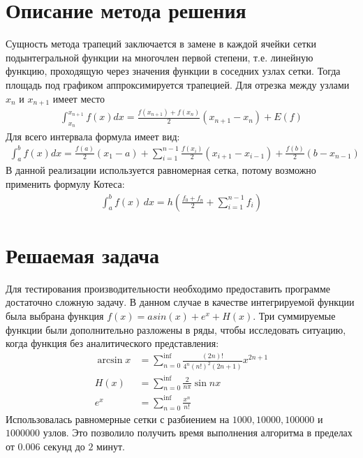 \documentclass[a4paper,12pt,titlepage,finall]{article}
\begin{document}
\section{Описание метода решения}
Сущность метода трапеций заключается в замене в каждой ячейки сетки подынтегральной функции на многочлен первой степени, т.е. линейную функцию, проходящую через значения функции в соседних узлах сетки. Тогда площадь под графиком аппроксимируется трапецией. Для отрезка между узлами $x_n$ и $x_{n+1}$ имеет место
\begin{align*}
\int^{x_{n+1}}_{x_n} f(x) dx = \frac{f(x_{n+1}) + f(x_{n})}{2}(x_{n+1} - x_n) + E(f)
\end{align*}
Для всего интервала формула имеет вид:
\begin{align*}
\int^b_a f(x) dx = \frac{f(a)}{2} (x_1 - a) + \sum_{i=1}^{n-1} \frac{f(x_i)}{2} (x_{i+1} - x_{i-1}) + \frac{f(b)}{2} (b - x_{n-1})
\end{align*}
В данной реализации используется равномерная сетка, потому возможно применить формулу Котеса:
\begin{align*}
\int^b_a f(x)\,dx = h \left( \frac{f_0 + f_n}{2} + \sum_{i=1}^{n-1} f_i \right)
\end{align*}

\section{Решаемая задача}
Для тестирования производительности необходимо предоставить программе достаточно сложную задачу. В данном случае в качестве интегрируемой функции была выбрана функция $f(x) = asin(x) + e^x + H(x)$. Три суммируемые функции были дополнительно разложены в ряды, чтобы исследовать ситуацию, когда функция без аналитического представления:
\begin{align*}
\arcsin x &= \sum^{\inf}_{n=0} \frac{(2n)!}{4^n (n!)^2 (2n+1)} x^{2n+1} \\
H(x) &= \sum^{\inf}_{n=0} \frac{2}{n \pi} \sin nx\\
e^x &=  \sum^{\inf}_{n=0} \frac{x^n}{n!}
\end{align*}
Использовалась равномерные сетки с разбиением на $1000, 10 000, 100 000$ и $1 000 000$ узлов. Это позволило получить время выполнения алгоритма в пределах от $0.006$ секунд до $2$ минут.
\end{document}
